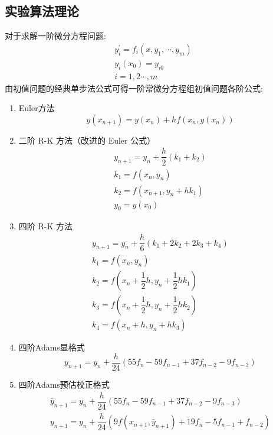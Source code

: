 \documentclass[12pt, a4paper, oneside]{ctexart}
\begin{document}
\subsection{实验算法理论}
对于求解一阶微分方程问题:
$$
\begin{array}{l}
    y_{i}^{\prime}=f_{i}\left(x, y_{1}, \cdots, y_{m}\right) \\
    y_{i}\left(x_{0}\right)=y_{i 0} \\
    i=1,2 \cdots, m
\end{array}
$$
由初值问题的经典单步法公式可得一阶常微分方程组初值问题各阶公式:
\begin{enumerate}
    \item Euler方法
    $$y(x_{n+1}) = y(x_{n}) + h f(x_n,y(x_n))$$
    \item 二阶 R-K 方法（改进的 Euler 公式）
    $$
    \begin{array}{l}
        y_{n+1}=y_{n}+\dfrac{h}{2}\left(k_{1}+k_{2}\right) \\
        k_{1}=f\left(x_{n}, y_{n}\right) \\
        k_{2}=f\left(x_{n+1}, y_{n}+h k_{1}\right) \\
        y_{0}=y\left(x_{0}\right)
    \end{array}
    $$
    \item 四阶 R-K 方法
    $$
    \begin{array}{l}
        y_{n+1}=y_{n}+\dfrac{h}{6}\left(k_{1}+2 k_{2}+2 k_{3}+k_{4}\right) \\
        k_{1}=f\left(x_{n}, y_{n}\right) \\
        k_{2}=f\left(x_{n}+\dfrac{1}{2} h, y_{n}+\dfrac{1}{2} h k_{1}\right) \\
        k_{3}=f\left(x_{n}+\dfrac{1}{2} h, y_{n}+\dfrac{1}{2} h k_{2}\right) \\
        k_{4}=f\left(x_{n}+h, y_{n}+h k_{3}\right)
    \end{array}
    $$
    \item 四阶Adams显格式
    $$
    y_{n+1}=y_{n}+\dfrac{h}{24}\left( 55 f_{n} - 59 f_{n-1} + 37 f_{n-2} - 9 f_{n-3} \right)
    $$
    \item 四阶Adams预估校正格式
    $$
    \begin{array}{l}
        \bar y_{n+1}=y_{n}+\dfrac{h}{24}\left( 55 f_{n} - 59 f_{n-1} + 37 f_{n-2} - 9 f_{n-3} \right) \\
        y_{n+1}=y_{n}+\dfrac{h}{24} \left( 9 f(x_{n+1},\bar y_{n+1}) + 19 f_{n} - 5 f_{n-1} + f_{n-2} \right)
    \end{array}
    $$
\end{enumerate}
\end{document}
